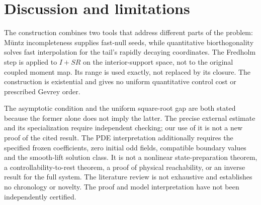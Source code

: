 \section{Discussion and limitations}\label{sec:discussion}
The construction combines two tools that address different parts of the problem: M\"untz incompleteness supplies fast-null seeds, while quantitative biorthogonality solves fast interpolation for the tail's rapidly decaying coordinates. The Fredholm step is applied to \(I+SR\) on the interior-support space, not to the original coupled moment map. Its range is used exactly, not replaced by its closure. The construction is existential and gives no uniform quantitative control cost or prescribed Gevrey order.

The asymptotic condition and the uniform square-root gap are both stated because the former alone does not imply the latter. The precise external estimate and its specialization require independent checking; our use of it is not a new proof of the cited result. The PDE interpretation additionally requires the specified frozen coefficients, zero initial odd fields, compatible boundary values and the smooth-lift solution class. It is not a nonlinear state-preparation theorem, a controllability-to-rest theorem, a proof of physical reachability, or an inverse result for the full system. The literature review is not exhaustive and establishes no chronology or novelty. The proof and model interpretation have not been independently certified.
